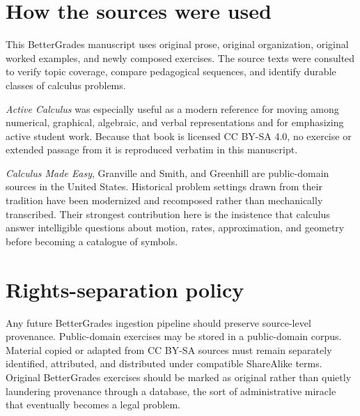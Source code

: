 \documentclass[11pt,openany]{book}
\theoremstyle{bgplain}
\begin{document}
\section*{How the sources were used}

This BetterGrades manuscript uses original prose, original organization, original worked examples, and newly composed exercises. The source texts were consulted to verify topic coverage, compare pedagogical sequences, and identify durable classes of calculus problems.

\emph{Active Calculus} was especially useful as a modern reference for moving among numerical, graphical, algebraic, and verbal representations and for emphasizing active student work. Because that book is licensed CC BY-SA 4.0, no exercise or extended passage from it is reproduced verbatim in this manuscript.

\emph{Calculus Made Easy}, Granville and Smith, and Greenhill are public-domain sources in the United States. Historical problem settings drawn from their tradition have been modernized and recomposed rather than mechanically transcribed. Their strongest contribution here is the insistence that calculus answer intelligible questions about motion, rates, approximation, and geometry before becoming a catalogue of symbols.

\section*{Rights-separation policy}

Any future BetterGrades ingestion pipeline should preserve source-level provenance. Public-domain exercises may be stored in a public-domain corpus. Material copied or adapted from CC BY-SA sources must remain separately identified, attributed, and distributed under compatible ShareAlike terms. Original BetterGrades exercises should be marked as original rather than quietly laundering provenance through a database, the sort of administrative miracle that eventually becomes a legal problem.

\end{document}
